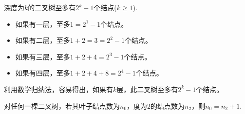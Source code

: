 %
%
\begin{frame}
\begin{xingzhi}[2]
深度为$k$的二叉树至多有$2^k-1$个结点($k\ge1$). 
\end{xingzhi}

\begin{itemize}
\item 如果有一层，至多$1=2^1-1$个结点。
\item 如果有二层，至多$1+2=3=2^2-1$个结点。
\item 如果有三层，至多$1+2+4=2^3-1$个结点。
\item 如果有四层，至多$1+2+4+8=2^4-1$个结点。
\end{itemize}
利用数学归纳法，容易得出，如果有$k$层，此二叉树至多有$2^{k}-1$个结点。
\end{frame}
%
%
\begin{frame}
\begin{xingzhi}[3]
对任何一棵二叉树，若其叶子结点数为$n_0$，度为$2$的结点数为$n_2$，则$n_0=n_2+1$.
\end{xingzhi}
\end{frame}
%

